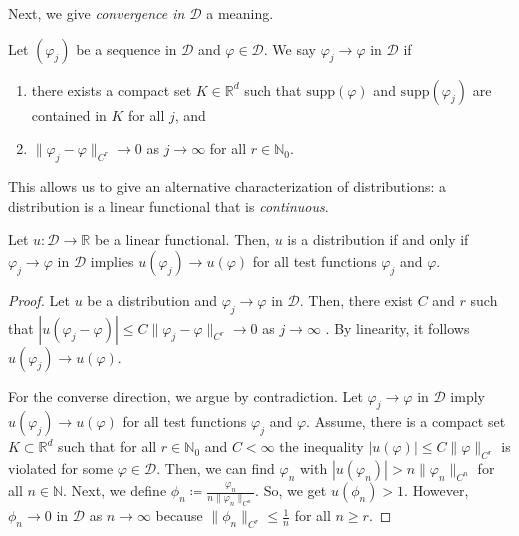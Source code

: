 Next, we give \emph{convergence in \(\mathcal{D}\)} a meaning.

\begin{definition}[Convergence]
    Let \((\varphi_j)\) be a sequence in \(\mathcal{D}\) and \(\varphi \in \mathcal{D}\). We say $
        \varphi_j \to \varphi  \text{ in \(\mathcal{D}\)}
    $
    if 
    \begin{enumerate}[label=(\roman*)]
        \item there exists a compact set \(K \in \mathbb{R}^d\) such that \(\mathrm{supp}(\varphi)\) and \(\mathrm{supp}(\varphi_j)\) are contained in \(K\) for all \(j\), and 
        \item \(\lVert \varphi_j - \varphi \rVert_{C^r} \to 0\) as \(j \to \infty\) for all \(r \in \mathbb{N}_0\).
    \end{enumerate} 
\end{definition}

This allows us to give an alternative characterization of distributions: a distribution is a linear functional that is \emph{continuous}.

\begin{lemma}
    Let \(u: \mathcal{D} \to \mathbb{R}\) be a linear functional. Then, \(u\) is a {distribution} if and only if \(\varphi_j \to \varphi\) in \(\mathcal{D}\) implies \(u(\varphi_j) \to u(\varphi)\) for all test functions \(\varphi_j\) and \(\varphi\).
\end{lemma}

\begin{proof}
    Let \(u\) be a distribution and \(\varphi_j \to \varphi\) in \(\mathcal{D}\). Then, there exist \(C\) and \(r\) such that \(|u(\varphi_j -\varphi)| \leq C \lVert \varphi_j - \varphi \rVert_{C^r} \to 0\) as \(j \to \infty\) . By linearity, it follows \(u(\varphi_j) \to u(\varphi)\).

    For the converse direction, we argue by contradiction. Let \(\varphi_j \to \varphi\) in \(\mathcal{D}\) imply \(u(\varphi_j) \to u(\varphi)\) for all test functions \(\varphi_j\) and \(\varphi\). Assume, there is a compact set \(K \subset \mathbb{R}^d\) such that for all \(r \in \mathbb{N}_0\) and \(C < \infty\) the inequality \(|u(\varphi)| \leq C \lVert\varphi\rVert_{C^r}\) is violated for some \(\varphi \in \mathcal{D}\). Then, we can find \(\varphi_n\) with \(|u(\varphi_n)| > n \lVert \varphi_n \rVert_{C^n}\) for all \(n \in \mathbb{N}\). Next, we define \(\phi_n \coloneqq \frac{\varphi_n}{n \lVert \varphi_n \rVert_{C^n}}\). So, we get \(u(\phi_n) > 1\). However, \(\phi_n \to 0\) in \(\mathcal{D}\) as \(n \to \infty\) because \(\lVert \phi_n \rVert_{C^r} \leq \frac{1}{n}\) for all \(n \geq r\).
\end{proof}

